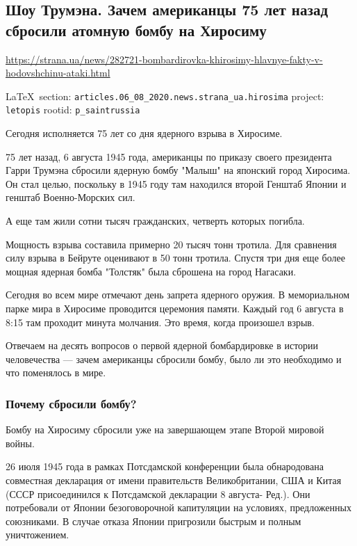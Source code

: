  
 
\subsection{Шоу Трумэна. Зачем американцы 75 лет назад сбросили атомную бомбу на Хиросиму}
\url{https://strana.ua/news/282721-bombardirovka-khirosimy-hlavnye-fakty-v-hodovshchinu-ataki.html}
  
\vspace{0.5cm}
 {\ifDEBUG\small\LaTeX~section: \verb|articles.06_08_2020.news.strana_ua.hirosima| project: \verb|letopis| rootid: \verb|p_saintrussia| \fi}
\vspace{0.5cm}

Сегодня исполняется 75 лет со дня ядерного взрыва в Хиросиме.

75 лет назад, 6 августа 1945 года, американцы по приказу своего президента
Гарри Трумэна сбросили ядерную бомбу "Малыш" на японский город Хиросима. Он
стал целью, поскольку в 1945 году там находился второй Генштаб Японии и генштаб
Военно-Морских сил. 

А еще там жили сотни тысяч гражданских, четверть которых погибла. 

Мощность взрыва составила примерно 20 тысяч тонн тротила. Для сравнения силу
взрыва в Бейруте оценивают в 50 тонн тротила. Спустя три дня еще более мощная
ядерная бомба "Толстяк" была сброшена на город Нагасаки.

Сегодня во всем мире отмечают день запрета ядерного оружия. В мемориальном
парке мира в Хиросиме проводится церемония памяти. Каждый год 6 августа в 8:15
там проходит минута молчания. Это время, когда произошел взрыв.

Отвечаем на десять вопросов о первой ядерной бомбардировке в истории
человечества --- зачем американцы сбросили бомбу, было ли это необходимо и что
поменялось в мире.

\subsubsection{Почему сбросили бомбу?}

Бомбу на Хиросиму сбросили уже на завершающем этапе Второй мировой войны.

26 июля 1945 года в рамках Потсдамской конференции была обнародована
совместная декларация от имени правительств Великобритании, США и Китая (СССР
присоединился к Потсдамской декларации 8 августа- Ред.). Они потребовали от
Японии безоговорочной капитуляции на условиях, предложенных союзниками. В
случае отказа Японии пригрозили быстрым и полным уничтожением.

